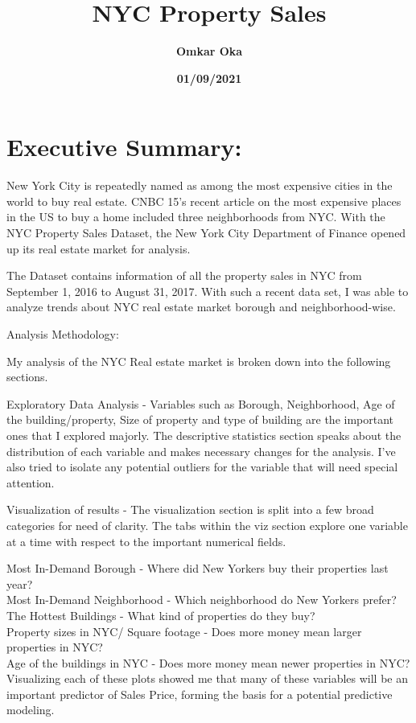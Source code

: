 \documentclass[
  a3paper,
]{article}
\title{\textbf{NYC Property Sales}}
\author{\textbf{Omkar Oka}}
\date{\textbf{01/09/2021}}
\begin{document}
\maketitle

{
\setcounter{tocdepth}{2}
\tableofcontents
}
\newpage

\hypertarget{executive-summary}{%
\section{\texorpdfstring{\textbf{Executive
Summary:}}{Executive Summary:}}\label{executive-summary}}

New York City is repeatedly named as among the most expensive cities in
the world to buy real estate. CNBC 15's recent article on the most
expensive places in the US to buy a home included three neighborhoods
from NYC. With the NYC Property Sales Dataset, the New York City
Department of Finance opened up its real estate market for analysis.

The Dataset contains information of all the property sales in NYC from
September 1, 2016 to August 31, 2017. With such a recent data set, I was
able to analyze trends about NYC real estate market borough and
neighborhood-wise.

Analysis Methodology:

My analysis of the NYC Real estate market is broken down into the
following sections.

Exploratory Data Analysis - Variables such as Borough, Neighborhood, Age
of the building/property, Size of property and type of building are the
important ones that I explored majorly. The descriptive statistics
section speaks about the distribution of each variable and makes
necessary changes for the analysis. I've also tried to isolate any
potential outliers for the variable that will need special attention.

Visualization of results - The visualization section is split into a few
broad categories for need of clarity. The tabs within the viz section
explore one variable at a time with respect to the important numerical
fields.

Most In-Demand Borough - Where did New Yorkers buy their properties last
year?\\
Most In-Demand Neighborhood - Which neighborhood do New Yorkers
prefer?\\
The Hottest Buildings - What kind of properties do they buy?\\
Property sizes in NYC/ Square footage - Does more money mean larger
properties in NYC?\\
Age of the buildings in NYC - Does more money mean newer properties in
NYC?\\
Visualizing each of these plots showed me that many of these variables
will be an important predictor of Sales Price, forming the basis for a
potential predictive modeling.
\end{document}
